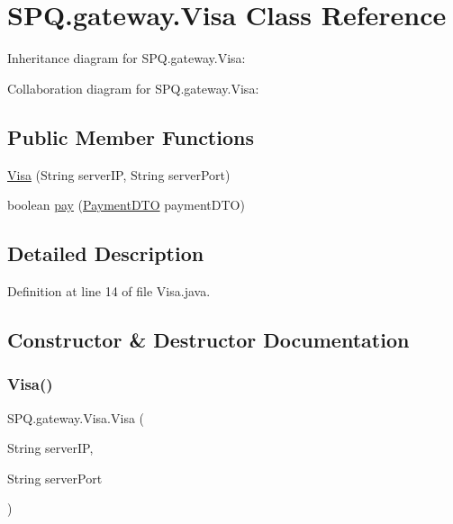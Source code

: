 \hypertarget{class_s_p_q_1_1gateway_1_1_visa}{}\section{S\+P\+Q.\+gateway.\+Visa Class Reference}
\label{class_s_p_q_1_1gateway_1_1_visa}


Inheritance diagram for S\+P\+Q.\+gateway.\+Visa\+:


Collaboration diagram for S\+P\+Q.\+gateway.\+Visa\+:
\subsection*{Public Member Functions}
\begin{DoxyCompactItemize}
\item 
\mbox{\hyperlink{class_s_p_q_1_1gateway_1_1_visa_ae3db27f4e13da7b9d7d9496a1b5eeb91}{Visa}} (String server\+IP, String server\+Port)
\item 
boolean \mbox{\hyperlink{class_s_p_q_1_1gateway_1_1_visa_a0ecda0414a0685174ec12ae96c8d3a68}{pay}} (\mbox{\hyperlink{class_s_p_q_1_1dto_1_1_payment_d_t_o}{Payment\+D\+TO}} payment\+D\+TO)
\end{DoxyCompactItemize}


\subsection{Detailed Description}


Definition at line 14 of file Visa.\+java.



\subsection{Constructor \& Destructor Documentation}
\mbox{\label{class_s_p_q_1_1gateway_1_1_visa_ae3db27f4e13da7b9d7d9496a1b5eeb91}} 
\subsubsection{\texorpdfstring{Visa()}{Visa()}}
{\footnotesize\ttfamily S\+P\+Q.\+gateway.\+Visa.\+Visa (\begin{DoxyParamCaption}\item[{String}]{server\+IP,  }\item[{String}]{server\+Port }\end{DoxyParamCaption})}



